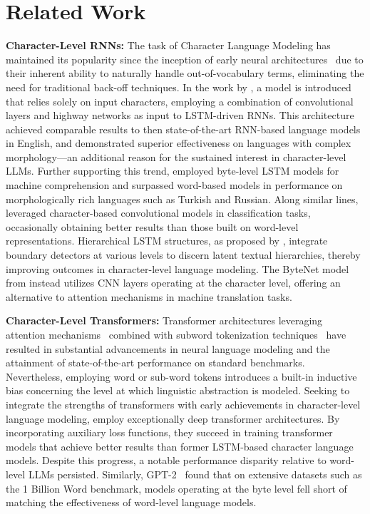 \section{Related Work}
\label{section:related_work}

\textbf{Character-Level RNNs:} The task of Character Language Modeling has maintained its popularity since the inception of early neural architectures~\citep{sutskever2011generating,mikolov2012subword,graves2013generating} due to their inherent ability to naturally handle out-of-vocabulary terms, eliminating the need for traditional back-off techniques. In the work by \cite{kim2016character}, a model is introduced that relies solely on input characters, employing a combination of convolutional layers and highway networks as input to LSTM-driven RNNs. This architecture achieved comparable results to then state-of-the-art RNN-based language models in English, and demonstrated superior effectiveness on languages with complex morphology—an additional reason for the sustained interest in character-level LLMs. Further supporting this trend, \cite{kenter2018byte} employed byte-level LSTM models for machine comprehension and surpassed word-based models in performance on morphologically rich languages such as Turkish and Russian. Along similar lines, \cite{zhang2015character} leveraged character-based convolutional models in classification tasks, occasionally obtaining better results than those built on word-level representations. Hierarchical LSTM structures, as proposed by \citet{chung2019hierarchical}, integrate boundary detectors at various levels to discern latent textual hierarchies, thereby improving outcomes in character-level language modeling. The ByteNet model from \cite{kalchbrenner2016neural} instead utilizes CNN layers operating at the character level, offering an alternative to attention mechanisms in machine translation tasks.

\textbf{Character-Level Transformers:} Transformer architectures leveraging attention mechanisms~\citep{vaswani2017attention} combined with subword tokenization techniques~\citep{sennrich-etal-2016-neural} have resulted in substantial advancements in neural language modeling and the attainment of state-of-the-art performance on standard benchmarks. Nevertheless, employing word or sub-word tokens introduces a built-in inductive bias concerning the level at which linguistic abstraction is modeled. Seeking to integrate the strengths of transformers with early achievements in character-level language modeling, \citet{al2019character} employ exceptionally deep transformer architectures. By incorporating auxiliary loss functions, they succeed in training transformer models that achieve better results than former LSTM-based character language models. Despite this progress, a notable performance disparity relative to word-level LLMs persisted. Similarly, GPT-2~\citep{radfordgpt2} found that on extensive datasets such as the 1 Billion Word benchmark, models operating at the byte level fell short of matching the effectiveness of word-level language models.

